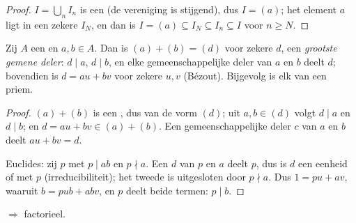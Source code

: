 \begin{proof}
$I = \bigcup_n I_n$ is een  (de vereniging is stijgend), dus
$I = (a)$; het element $a$ ligt in een zekere $I_N$, en dan is $I =
(a) \subseteq I_N \subseteq I_n \subseteq I$ voor $n \geq N$.
\end{proof}

\begin{lemma}\label{lem:b3:rings:bezout}
Zij $A$ een  en $a, b \in A$. Dan is $(a) + (b) =
(d)$ voor zekere $d$, een \emph{grootste gemene
deler}: $d \mid a$, $d \mid b$, en
elke gemeenschappelijke deler van $a$ en $b$ deelt $d$; bovendien
is $d = au + bv$ voor zekere $u, v$ (Bézout). Bijgevolg is elk
 van een  priem.
\end{lemma}

\begin{proof}
$(a) + (b)$ is een , dus van de vorm $(d)$; uit $a, b \in
(d)$ volgt $d \mid a$ en $d \mid b$; en $d = au + bv \in (a) +
(b)$. Een gemeenschappelijke deler $c$ van $a$ en $b$ deelt $au +
bv = d$.

Euclides: zij $p$  met $p \mid ab$ en $p \nmid a$. Een
 $d$ van $p$ en $a$ deelt $p$, dus is $d$ een
eenheid of  met $p$ (irreducibiliteit); het tweede is
uitgesloten door $p \nmid a$. Dus $1 = pu + av$, waaruit $b = pub +
abv$, en $p$ deelt beide termen: $p \mid b$.
\end{proof}

\begin{theorem}\label{thm:b3:rings:pidufd}
 $\Rightarrow$ factorieel.
\end{theorem}

